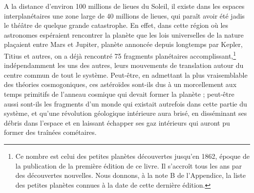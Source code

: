 \documentclass[a4paper, 11pt, oneside]{article}
\begin{document}
A la distance d'environ 100 millions de lieues du Soleil, il existe dans les espaces interplanétaires une zone large de 40 millions de lieues, qui paraît avoir été jadis le théâtre de quelque grande catastrophe. En effet, dans cette région où les astronomes espéraient rencontrer la planète que les lois universelles de la nature plaçaient entre Mars et Jupiter, planète annoncée depuis longtemps par Kepler, Titius et autres, on a déjà rencontré 75 fragments planétaires accomplissant,\footnote{Ce nombre est celui des petites planètes découvertes jusqu'en 1862, époque de la publication de la première édition de ce livre. Il s'accroît tous les ans par des découvertes nouvelles. Nous donnons, à la note B de l'Appendice, la liste des petites planètes connues à la date de cette dernière édition.} indépendamment les uns des autres, leurs mouvements de translation autour du centre commun de tout le système. Peut-être, en admettant la plus vraisemblable des théories cosmogoniques, ces astéroïdes sont-ils dus à un morcellement aux temps primitifs de l'anneau cosmique qui devait former la planète ; peut-être aussi sont-ils les fragments d'un monde qui existait autrefois dans cette partie du système, et qu'une révolution géologique intérieure aura brisé, en disséminant ses débris dans l'espace et en laissant échapper ses gaz intérieurs qui auront pu former des traînées cométaires.
\end{document}

